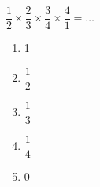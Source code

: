 $\dfrac12\times\dfrac23\times\dfrac34\times\dfrac41=\ldots$
\begin{multicols}{5}
  \begin{enumerate}[A/]
  \item 1
  \item $\dfrac12$
  \item $\dfrac13$
  \item $\dfrac14$
  \item 0
  \end{enumerate}
\end{multicols}